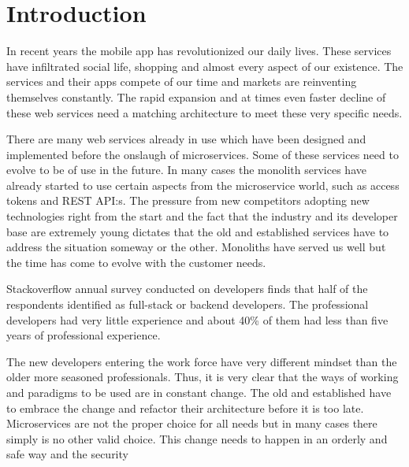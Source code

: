 \begin{sloppypar}
\section{Introduction}
\begin{sloppypar}
    In recent years the mobile app has revolutionized our daily lives. 
    These services have infiltrated social life, shopping and almost 
    every aspect of our existence. The services and their apps compete of 
    our time and markets are reinventing themselves constantly. The rapid 
    expansion and at times even faster decline of these web services 
    need a matching architecture to meet these very specific needs. 
\end{sloppypar}
\begin{sloppypar}
    There are many web services already in use which have been designed and 
    implemented before the onslaugh of microservices. Some of these services 
    need to evolve to be of use in the future. In many cases the monolith 
    services have already started to use certain aspects from the microservice 
    world, such as access tokens and REST API:s. The pressure from new 
    competitors adopting new technologies right from the start and the fact 
    that the industry and its developer base are extremely young dictates that 
    the old and established services have to address the situation someway or 
    the other. Monoliths have served us well but the time has come to evolve 
    with the customer needs.
\end{sloppypar}
\begin{sloppypar}
    Stackoverflow annual survey \citep{stackoverflowsurvey2019} conducted on 
    developers finds that half of the respondents identified as full-stack or 
    backend developers. The professional developers had very little experience 
    and about 40\% of them had less than five years of professional experience. 
\end{sloppypar}
\begin{sloppypar}
    The new developers entering the work force have very different mindset than 
    the older more seasoned professionals. Thus, it is very clear that the ways 
    of working and paradigms to be used are in constant change. The old and 
    established have to embrace the change and refactor their architecture 
    before it is too late. Microservices are not the proper choice for all needs
     \citep{newman2019} but in many cases there simply is no other valid choice.
    This change needs to happen in an orderly and safe way and the security 

\end{sloppypar}
\end{sloppypar}
